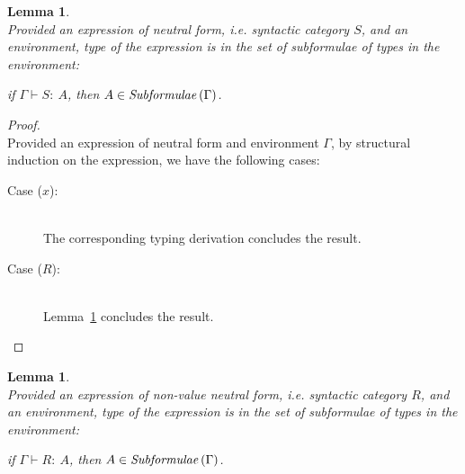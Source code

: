 \documentclass[11p,a4paper]{article}
\newcommand{\typecolor}{}
\newcommand{\termcolor}{}
\newcommand{\tp}[1]{{\typecolor #1}}
\newcommand{\tm}[1]{{\termcolor #1}}
\newtheorem{lemma}[theorem]{Lemma}
\newcommand{\expvar}[1]{#1}
\newcommand{\env}{\tp{\Gamma}}
\newcommand{\typing}[2]{\tm{#1:\ }\tp{#2}}
\newcommand{\txt}[1]{\text{\textit{#1}}}
\newcommand{\subformulae}[1]{\txt{Subformulae}\,(#1)}
\begin{document}
\begin{lemma}\ \\
\label{sub_S}
Provided an expression of neutral form, i.e. syntactic category $S$,
and an environment, type of the expression is in the set of
subformulae of types in the environment:
 
 if $\env \vdash \typing{S}{A}$, then $A \in \subformulae{\Gamma}$.
\end{lemma}

\begin{proof}\ \\
Provided an expression of neutral form and environment $\Gamma$,
by structural induction on the expression, we have the following cases:
\begin{description}
\item[Case ($\expvar{x}$):]\ \\ 
  The corresponding typing derivation concludes the result.
\item[Case ($R$):]\ \\
  Lemma~\ref{sub_R} concludes the result.   
\end{description}

\end{proof}

\begin{lemma}\ \\
\label{sub_R}
Provided an expression of non-value neutral form, i.e. syntactic
category $R$, and an environment, type of the expression is in the set
of subformulae of types in the environment:
 
 if $\Gamma \vdash \typing{R}{A}$, then $A \in \subformulae{\Gamma}$.
\end{lemma}
\end{document}
